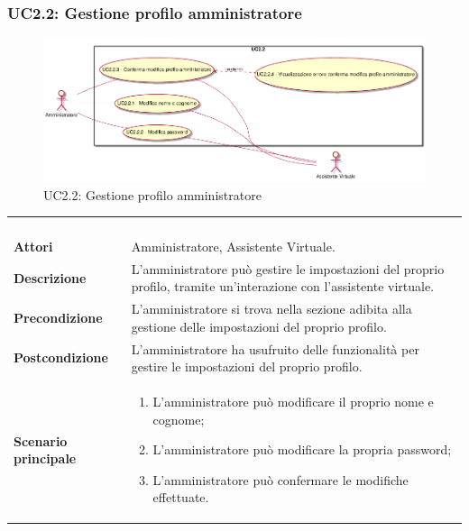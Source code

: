 \newpage\subsubsection{UC2.2: Gestione profilo amministratore}
\label{UC2.2}
\begin{figure}[h]
\centering
\includegraphics[width=\textwidth,height=\textheight,keepaspectratio]{images/UseCaseUC22.png}
\caption{UC2.2: Gestione profilo amministratore}
\end{figure}
\begin{longtable}{l|p{10cm}}
\rowcolor[gray]{0.8} \multicolumn{2}{c}{} \\
\rowcolor[gray]{0.8} \multicolumn{2}{c}{\textbf{UC2.2 - Gestione profilo amministratore}} \\
\rowcolor[gray]{0.8} \multicolumn{2}{c}{} \\
\hline
&\\
\textbf{Attori} & Amministratore, Assistente Virtuale.\\[7pt]
\textbf{Descrizione} & L'amministratore può gestire le impostazioni del proprio profilo, tramite un'interazione con l'assistente virtuale.\\[7pt]
\textbf{Precondizione} & L'amministratore si trova nella sezione adibita alla gestione delle impostazioni del proprio profilo.\\[7pt]
\textbf{Postcondizione} & L'amministratore ha usufruito delle funzionalità per gestire le impostazioni del proprio profilo.\\[7pt]
\textbf{Scenario principale} &\begin{enumerate}
\item  L'amministratore può modificare il proprio nome e cognome;
\item  L'amministratore può modificare la propria password;
\item  L'amministratore può confermare le modifiche effettuate.
\end{enumerate}
\\[7pt]\hline
\end{longtable}


